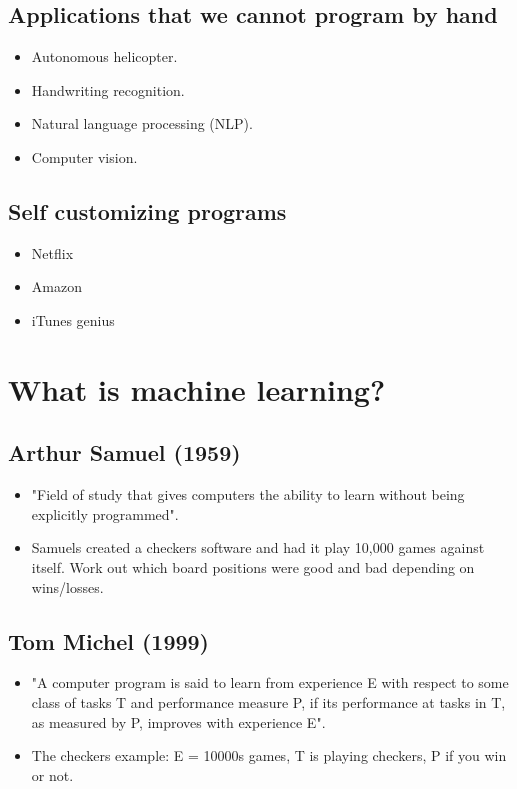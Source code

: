 \documentclass{article}
\begin{document}
\subsection*{Applications that we cannot program by hand}
\begin{itemize}
  \item Autonomous helicopter.
  \item Handwriting recognition.
  \item Natural language processing (NLP).
  \item Computer vision.
\end{itemize}

\subsection*{Self customizing programs}
\begin{itemize}
  \item Netflix
  \item Amazon
  \item iTunes genius
\end{itemize}

\section*{What is machine learning?}
\subsection*{Arthur Samuel (1959)}
\begin{itemize}
  \item "Field of study that gives computers the ability to learn without being explicitly programmed".
  \item Samuels created a checkers software and had it play 10,000 games against itself. Work out which board positions were good and bad depending on wins/losses.
\end{itemize}

\subsection*{Tom Michel (1999)}
\begin{itemize}
  \item  "A computer program is said to learn from experience E with respect to some class of tasks T and performance measure P, if its performance at tasks in T, as measured by P, improves with experience E".
  \item The checkers example: E = 10000s games, T is playing checkers, P if you win or not.
\end{itemize}
\end{document}
